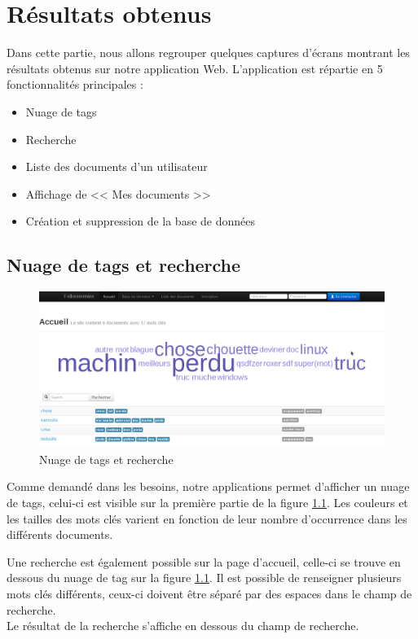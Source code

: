 \documentclass[12pt,a4paper,openany]{book}
\begin{document}
	\chapter{Résultats obtenus}
	Dans cette partie, nous allons regrouper quelques captures d'écrans montrant les résultats obtenus sur notre application Web.
	L'application est répartie en 5 fonctionnalités principales : 
	\begin{itemize}
		\item Nuage de tags
		\item Recherche
		\item Liste des documents d'un utilisateur
		\item Affichage de << Mes documents >> 
		\item Création et suppression de la base de données
	\end{itemize}
	\section{Nuage de tags et recherche}
	\begin{figure}[H]
		\centering
		\includegraphics[width=18cm]{screens/index.png} 
		\caption{Nuage de tags et recherche} 
		\label{fig:index}
	\end{figure}
	Comme demandé dans les besoins, notre applications permet d'afficher un nuage de tags, celui-ci est visible sur la première
	partie de la figure \ref{fig:index}. Les couleurs et les tailles des mots clés varient en fonction de leur nombre d'occurrence
	dans les différents documents.

	Une recherche est également possible sur la page d'accueil, celle-ci se trouve en dessous du nuage de tag sur la figure
	\ref{fig:index}. Il est possible de renseigner plusieurs mots clés différents, ceux-ci doivent être séparé par des espaces dans
	le champ de recherche.\\
	Le résultat de la recherche s'affiche en dessous du champ de recherche.
\end{document}

